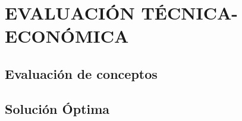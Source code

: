 \renewcommand{\baselinestretch}{1.5}

\chapter{EVALUACIÓN TÉCNICA-ECONÓMICA}

\section{Evaluación de conceptos}

\section{Solución Óptima}